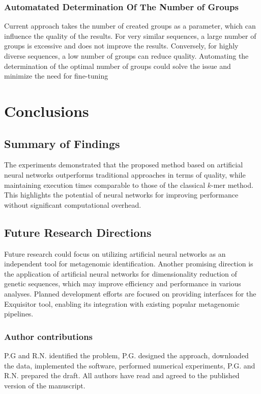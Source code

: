\documentclass[pdflatex,sn-vancouver-num]{sn-jnl}%
\begin{document}
            \subsubsection{Automatated Determination Of The Number of Groups}
                Current approach takes the number of created groups as a parameter, which can influence the quality of the results. For very similar sequences, a large number of groups is excessive and does not improve the results. Conversely, for highly diverse sequences, a low number of groups can reduce quality. Automating the determination of the optimal number of groups could solve the issue and minimize the need for fine-tuning

    \section{Conclusions}
        \subsection{Summary of Findings}
            The experiments demonstrated that the proposed method based on artificial neural networks outperforms traditional approaches in terms of quality, while maintaining execution times comparable to those of the classical $k$-mer method. This highlights the potential of neural networks for improving performance without significant computational overhead.

        \subsection{Future Research Directions}
        Future research could focus on utilizing artificial neural networks as an independent tool for metagenomic identification. Another promising direction is the application of artificial neural networks for dimensionality reduction of genetic sequences, which may improve efficiency and performance in various analyses. Planned development efforts are focused on providing interfaces for the Exquisitor tool, enabling its integration with existing popular metagenomic pipelines.


\subsubsection*{Author contributions}

P.G and R.N. identified the problem, P.G. designed the approach, downloaded the data, implemented the software, performed numerical experiments, P.G. and R.N. prepared the draft. All authors have read and agreed to the published version of the manuscript.
\end{document}
